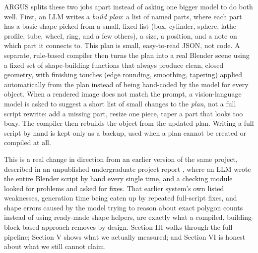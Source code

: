 \documentclass[conference]{IEEEtran}
\begin{document}
ARGUS splits these two jobs apart instead of asking one bigger model to do both well. First, an LLM writes a \emph{build plan}: a list of named parts, where each part has a basic shape picked from a small, fixed list (box, cylinder, sphere, lathe profile, tube, wheel, ring, and a few others), a size, a position, and a note on which part it connects to. This plan is small, easy-to-read JSON, not code. A separate, rule-based compiler then turns the plan into a real Blender scene using a fixed set of shape-building functions that always produce clean, closed geometry, with finishing touches (edge rounding, smoothing, tapering) applied automatically from the plan instead of being hand-coded by the model for every object. When a rendered image does not match the prompt, a vision-language model is asked to suggest a short list of small changes to the \emph{plan}, not a full script rewrite: add a missing part, resize one piece, taper a part that looks too boxy. The compiler then rebuilds the object from the updated plan. Writing a full script by hand is kept only as a backup, used when a plan cannot be created or compiled at all.

This is a real change in direction from an earlier version of the same project, described in an unpublished undergraduate project report \cite{dahal2026thesis}, where an LLM wrote the entire Blender script by hand every single time, and a checking module looked for problems and asked for fixes. That earlier system's own listed weaknesses, generation time being eaten up by repeated full-script fixes, and shape errors caused by the model trying to reason about exact polygon counts instead of using ready-made shape helpers, are exactly what a compiled, building-block-based approach removes by design. Section III walks through the full pipeline; Section V shows what we actually measured; and Section VI is honest about what we still cannot claim.
\end{document}
